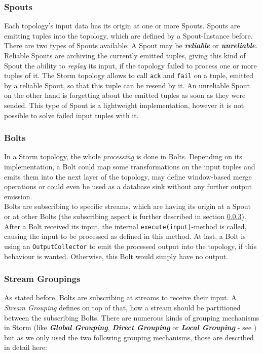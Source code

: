 \subsubsection{Spouts}
\label{sect:Spouts}
	Each topology's input data has its origin at one or more Spouts. Spouts are emitting tuples into the topology, which are defined by a Spout-Instance before. There are two types of Spouts available: A Spout may be \textit{\textbf{reliable}} or \textit{\textbf{unreliable}}. Reliable Spouts are archiving the currently emitted tuples, giving this kind of Spout the ability to \textit{replay} its input, if the topology failed to process one or more tuples of it. The Storm topology allows to call \texttt{ack} and \texttt{fail} on a tuple, emitted by a reliable Spout, so that this tuple can be resend by it. An unreliable Spout on the other hand is forgetting about the emitted tuples as soon as they were sended. This type of Spout is a lightweight implementation, however it is not possible to solve failed input tuples with it.
	
\subsubsection{Bolts}
\label{sect:Bolts}
	In a Storm topology, the whole \textit{processing} is done in Bolts. Depending on its implementation, a Bolt could map some transformations on the input tuples and emits them into the next layer of the topology, may define window-based merge operations or could even be used as a database sink without any further output emission.\\
	Bolts are subscribing to specific streams, which are having its origin at a Spout or at other Bolts (the subscribing aspect is further described in section \ref{sect:StreamGroupings}). After a Bolt received its input, the internal \texttt{execute(input)}-method is called, causing the input to be processed as defined in this method. At last, a Bolt is using an \texttt{OutputCollector} to emit the processed output into the topology, if this behaviour is wanted. Otherwise, this Bolt would simply have no output.
	
	
\subsubsection{Stream Groupings}
\label{sect:StreamGroupings}
	As stated before, Bolts are subscribing at streams to receive their input. A \textit{Stream Grouping} defines on top of that, how a stream should be partitioned between the subscribing Bolts. There are numerous kinds of grouping mechanisms in Storm (like \textit{\textbf{Global Grouping}}, \textit{\textbf{Direct Grouping}} or \textit{\textbf{Local Grouping}} - see \cite{webAnchor:streamGrouping}) but as we only used the two following grouping mechanisms, those are described in detail here:
	
